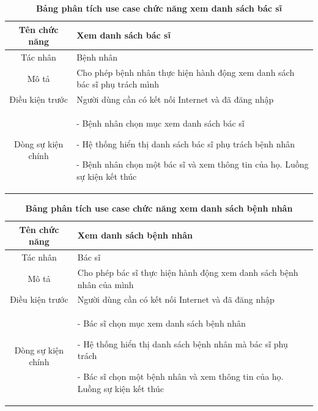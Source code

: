   \begin{table}[H]
    \caption{\bfseries \fontsize{12pt}{0pt}\selectfont Bảng phân tích use case chức năng xem danh sách bác sĩ}
    \centering
    \begin{tabularx}{0.9\textwidth}{|c|X|}
      \hline
      \textbf{Tên chức năng} & \textbf{Xem danh sách bác sĩ} \\
      \hline
      Tác nhân & Bệnh nhân \\
      \hline
      Mô tả & Cho phép bệnh nhân thực hiện hành động xem danh sách bác sĩ phụ trách mình \\
      \hline
      Điều kiện trước & Người dùng cần có kết nối Internet và đã đăng nhập \\
      \hline
      Dòng sự kiện chính & 
        - Bệnh nhân chọn mục xem danh sách bác sĩ
        
        - Hệ thống hiển thị danh sách bác sĩ phụ trách bệnh nhân 

        - Bệnh nhân chọn một bác sĩ và xem thông tin của họ. Luồng sự kiện kết thúc        
        \\
      \hline
    \end{tabularx}
  \end{table}

  \begin{table}[H]
    \caption{\bfseries \fontsize{12pt}{0pt}\selectfont Bảng phân tích use case chức năng xem danh sách bệnh nhân}
    \centering
    \begin{tabularx}{0.9\textwidth}{|c|X|}
      \hline
      \textbf{Tên chức năng} & \textbf{Xem danh sách bệnh nhân} \\
      \hline
      Tác nhân & Bác sĩ \\
      \hline
      Mô tả & Cho phép bác sĩ thực hiện hành động xem danh sách bệnh nhân của mình \\
      \hline
      Điều kiện trước & Người dùng cần có kết nối Internet và đã đăng nhập \\
      \hline
      Dòng sự kiện chính & 
        - Bác sĩ chọn mục xem danh sách bệnh nhân
        
        - Hệ thống hiển thị danh sách bệnh nhân mà bác sĩ phụ trách 

        - Bác sĩ chọn một bệnh nhân và xem thông tin của họ. Luồng sự kiện kết thúc                
        \\
      \hline
    \end{tabularx}
  \end{table}
  
